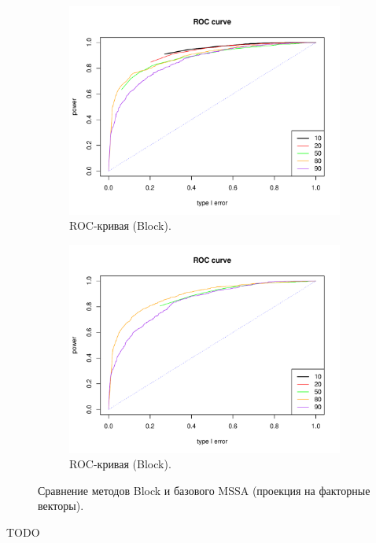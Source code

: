 \documentclass[specialist,
substylefile = spbu_report.rtx,
subf,href,colorlinks=true, 12pt]{disser}
\theoremstyle{definition}
\begin{document}
\begin{figure}
\begin{subfigure}[t]{0.45\textwidth}
			\centering
			\includegraphics[width=\textwidth]{roc_block_fa.pdf}
			\caption{ROC-кривая (Block).}
		\end{subfigure}\hspace{\fill}
		\begin{subfigure}[t]{0.45\textwidth}
			\centering
			\includegraphics[width=\textwidth]{roc_mssa_fa.pdf}
			\caption{ROC-кривая (Block).}
		\end{subfigure}
		\caption{Сравнение методов Block и базового MSSA (проекция на факторные векторы).}
		\label{fig:block_fa}
	\end{figure}
	\conclusion
	TODO
	
	
\end{document}
